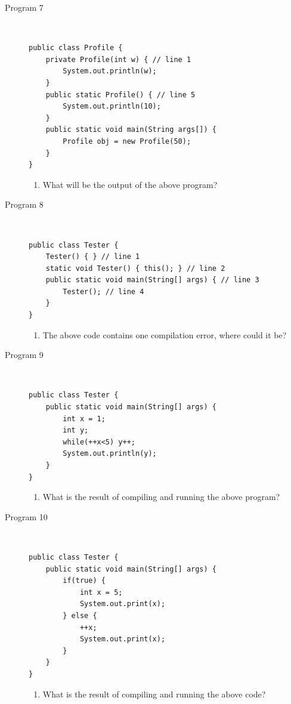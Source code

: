 \documentclass[11pt,a4paper]{article}
\def\AnswerBox{\fbox{\begin{minipage}{4in}\hfill\vspace{0.5in}\end{minipage}}}
\begin{document}
\begin{description}
 \item [Program 7] \
\begin{lstlisting}
public class Profile {
    private Profile(int w) { // line 1
        System.out.println(w);
    }
    public static Profile() { // line 5
        System.out.println(10);
    }
    public static void main(String args[]) {
        Profile obj = new Profile(50);
    }
}
\end{lstlisting}

\AnswerBox

\begin{enumerate}[label=\bfseries Q\arabic*:]\itemsep10pt
\item What will be the output of the above program?
\end{enumerate}


\item [Program 8] \
\begin{lstlisting}
public class Tester {
    Tester() { } // line 1
    static void Tester() { this(); } // line 2
    public static void main(String[] args) { // line 3
        Tester(); // line 4
    }
}
\end{lstlisting}

\AnswerBox

\begin{enumerate}[label=\bfseries Q\arabic*:]\itemsep10pt
\item The above code contains one compilation error, where could it be?
\end{enumerate}


\item [Program 9] \
\begin{lstlisting}
public class Tester {
    public static void main(String[] args) {
        int x = 1;
        int y;
        while(++x<5) y++;
        System.out.println(y);
    }
}
\end{lstlisting}


\AnswerBox

\begin{enumerate}[label=\bfseries Q\arabic*:]\itemsep10pt
        \item What is the result of compiling and running the above program?
    \end{enumerate}

\item [Program 10] \
\begin{lstlisting}
public class Tester {
    public static void main(String[] args) {
        if(true) {
            int x = 5;
            System.out.print(x);
        } else {
            ++x;
            System.out.print(x);
        }
    }
}
\end{lstlisting}

\AnswerBox

\begin{enumerate}[label=\bfseries Q\arabic*:]\itemsep10pt
                    \item What is the result of compiling and running the above code?
                            \end{enumerate}


\end{description}
    
\end{document}

